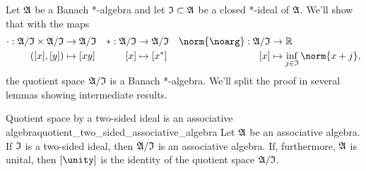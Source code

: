 Let \(\mathfrak{A}\) be a Banach *-algebra and let \(\mathfrak{I}\subset \mathfrak{A}\) be a closed *-ideal of \(\mathfrak{A}\). We'll show that with the maps
\begin{align*}
    \cdot : \algebra{A}/\algebra{I} \times \algebra{A}/\algebra{I} &\to \algebra{A}/\algebra{I}&
    * : \algebra{A}/\algebra{I} &\to \algebra{A}/\algebra{I}&
    \norm{\noarg} : \algebra{A}/\algebra{I} &\to \mathbb{R}\\
    ([x],[y]) &\mapsto [xy]&
    [x] &\mapsto [x^*]&
    [x] &\mapsto \inf_{j \in \algebra{I}}{\norm{x + j}},
\end{align*}
the quotient space \(\mathfrak{A}/\mathfrak{I}\) is a Banach *-algebra. We'll split the proof in several lemmas showing intermediate results.

\begin{lemma}{Quotient space by a two-sided ideal is an associative algebra}{quotient_two_sided_associative_algebra}
    Let \(\mathfrak{A}\) be an associative algebra. If \(\mathfrak{I}\) is a two-sided ideal, then \(\mathfrak{A}/\mathfrak{I}\) is an associative algebra. If, furthermore, \(\mathfrak{A}\) is unital, then \([\unity]\) is the identity of the quotient space \(\mathfrak{A}/\mathfrak{I}\).
\end{lemma}
